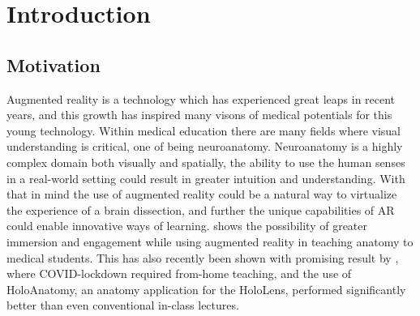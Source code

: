 \chapter{Introduction}



\section{Motivation}


Augmented reality is a technology which has experienced great leaps in recent years, and this growth has inspired many visons of medical potentials for this young technology. 
Within medical education there are many fields where visual understanding is critical, one of being neuroanatomy. Neuroanatomy is a highly complex domain both visually and spatially, the ability to use the human senses in a real-world setting could result in greater intuition and understanding. With that in mind the use of augmented reality could be a natural way to virtualize the experience of a brain dissection, and further the unique capabilities of AR could enable innovative ways of learning. \citep{Moro2017} shows the possibility of greater immersion and engagement while using augmented reality in teaching anatomy to medical students. This has also recently been shown with promising result by  \citep{Wish2020}, where COVID-lockdown required from-home teaching, and the use of HoloAnatomy, an anatomy application for the HoloLens, performed significantly better than even conventional in-class lectures.






